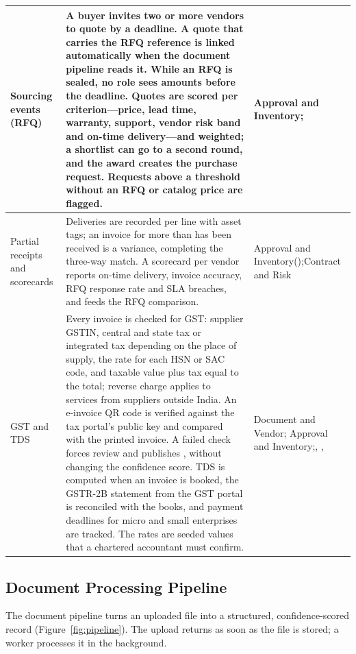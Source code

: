 {\begin{longtable}{|L{0.17\textwidth}|L{0.47\textwidth}|L{0.26\textwidth}|}
Sourcing events (RFQ) & A buyer invites two or more vendors to quote by a deadline. A quote that carries the RFQ reference is linked automatically when the document pipeline reads it. While an RFQ is sealed, no role sees amounts before the deadline. Quotes are scored per criterion---price, lead time, warranty, support, vendor risk band and on-time delivery---and weighted; a shortlist can go to a second round, and the award creates the purchase request. Requests above a threshold without an RFQ or catalog price are flagged. & Approval and Inventory;  \\ \hline
Partial receipts and scorecards & Deliveries are recorded per line with asset tags; an invoice for more than has been received is a variance, completing the three-way match. A scorecard per vendor reports on-time delivery, invoice accuracy, RFQ response rate and SLA breaches, and feeds the RFQ comparison. & Approval and Inventory\newline (\newline{});\newline Contract and Risk \\ \hline
GST and TDS & Every invoice is checked for GST: supplier GSTIN, central and state tax or integrated tax depending on the place of supply, the rate for each HSN or SAC code, and taxable value plus tax equal to the total; reverse charge applies to services from suppliers outside India. An e-invoice QR code is verified against the tax portal's public key and compared with the printed invoice. A failed check forces review and publishes , without changing the confidence score. TDS is computed when an invoice is booked, the GSTR-2B statement from the GST portal is reconciled with the books, and payment deadlines for micro and small enterprises are tracked. The rates are seeded values that a chartered accountant must confirm. & Document and Vendor; Approval and Inventory;\newline {}, ,  \\ \hline
\end{longtable}}

\subsection{Document Processing Pipeline}
The document pipeline turns an uploaded file into a structured, confidence-scored record (Figure~\ref{fig:pipeline}). The upload returns as soon as the file is stored; a worker processes it in the background.

